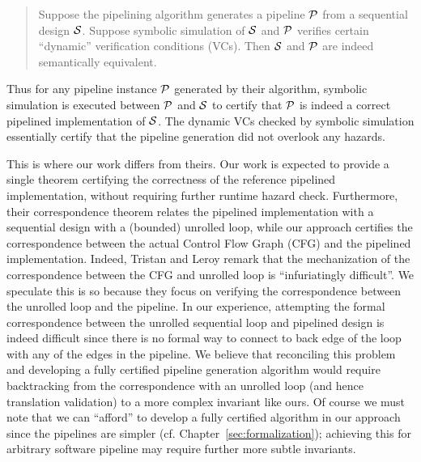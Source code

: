 \begin{quote}
Suppose the pipelining algorithm generates a pipeline
${\cal{P}}$ from a sequential design ${\cal{S}}$.  Suppose
symbolic simulation of ${\cal{S}}$ and ${\cal{P}}$ verifies
certain ``dynamic'' verification conditions (VCs).  Then
${\cal{S}}$ and ${\cal{P}}$ are indeed semantically
equivalent.
\end{quote}

\noindent
Thus for any pipeline instance ${\cal{P}}$ generated by
their algorithm, symbolic simulation is executed between
${\cal{P}}$ and ${\cal{S}}$ to certify that ${\cal{P}}$ is
indeed a correct pipelined implementation of ${\cal{S}}$.
The dynamic VCs checked by symbolic simulation essentially
certify that the pipeline generation did not overlook any
hazards.

This is where our work differs from theirs.  Our work is
expected to provide a single theorem certifying the
correctness of the reference pipelined implementation,
without requiring further runtime hazard check.
Furthermore, their correspondence theorem relates the
pipelined implementation with a sequential design with a
(bounded) unrolled loop, while our approach certifies the
correspondence between the actual Control Flow Graph (CFG)
and the pipelined implementation.  Indeed, Tristan and Leroy
remark that the mechanization of the correspondence between
the CFG and unrolled loop is ``infuriatingly difficult''.
We speculate this is so because they focus on verifying the
correspondence between the unrolled loop and the pipeline.
In our experience, attempting the formal correspondence between the unrolled
sequential loop and pipelined design is indeed difficult since
there is no formal way to connect to back edge of the loop
with any of the edges in the pipeline.  We believe that
reconciling this problem and developing a fully certified
pipeline generation algorithm would require backtracking
from the correspondence with an unrolled loop (and hence
translation validation) to a more complex invariant like
ours.  Of course we must note that we can ``afford'' to
develop a fully certified algorithm in our approach since
the pipelines are simpler
(cf. Chapter~\ref{sec:formalization}); achieving this for
arbitrary software pipeline may require further more subtle
invariants.


